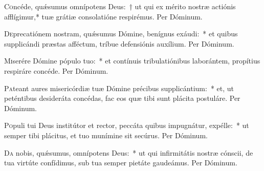 \documentclass[vesperale_romanum.tex]{subfiles}
\begin{document}
\oratio

\lettrine{C}{o}ncéde, quǽsumus omnípotens Deus:~† ut qui ex mérito nostræ actiónis afflígimur,* tuæ grátiæ consolatióne respirémus.
Per Dóminum.






\oratio

\lettrine{D}{e}precatiónem nostram, quǽsumus Dómine, benígnus exáudi:~* et quibus supplicándi præstas afféctum, tríbue defensiónis auxílium. Per Dóminum.



\oratio

\lettrine{M}{i}serére Dómine pópulo tuo:~* et contínuis tribulatiónibus laborántem, propítius respiráre concéde. Per Dóminum.



\oratio

\lettrine{P}{a}teant aures misericórdiæ tuæ Dómine précibus supplicántium:~* et, ut peténtibus desideráta concédas, fac eos quæ tibi sunt plácita postuláre.
Per Dóminum.



\oratio

\lettrine{P}{o}puli tui Deus institútor et rector, peccáta quibus impugnátur, expélle:~* ut semper tibi plácitus, et tuo munímine sit secúrus. Per Dóminum.



\oratio

\lettrine{D}{a}  nobis, quǽsumus, omnípotens Deus:~* ut qui infirmitátis nostræ cónscii, de tua virtúte confídimus, sub tua semper pietáte gaudeámus.
Per Dóminum.
\end{document}
